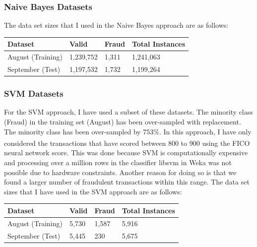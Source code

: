 \documentclass[conference]{IEEEtran}
\begin{document}

\subsubsection{Naive Bayes Datasets}

 The data set sizes that I used in the Naive Bayes approach are as follows:
 \begin{center}
\begin{tabular}{ | l | l | l | l | }
\hline
Dataset & Valid & Fraud & Total Instances \\ [0.5ex]
\hline\hline
August (Training) & 1,239,752 & 1,311 & 1,241,063\\
\hline
September (Test) & 1,197,532 & 1,732 & 1,199,264 \\
\hline
\end{tabular}
\end{center}

\vspace{1mm}

\subsubsection{SVM Datasets}

For the SVM approach, I have used a subset of these datasets. The minority class (Fraud) in the training set (August) has been over-sampled with replacement. The minority class has been over-sampled by 753\%. In this approach, I have only considered the transactions that have scored between 800 to 900 using the FICO\textsuperscript{\textregistered} neural network score. This was done because SVM is computationally expensive and processing over a million rows in the classifier libsvm in Weka was not possible due to hardware constraints. Another reason for doing so is that we found a larger number of fraudulent transactions within this range. The data set sizes that I have used in the SVM approach are as follows:
 \begin{center}
\begin{tabular}{ | l | l | l | l | }
\hline
Dataset & Valid & Fraud & Total Instances \\ [0.5ex]
\hline\hline
August (Training) & 5,730 & 1,587 & 5,916\\
\hline
September (Test) &  5,445 & 230 & 5,675 \\
\hline
\end{tabular}
\end{center}
\end{document}

